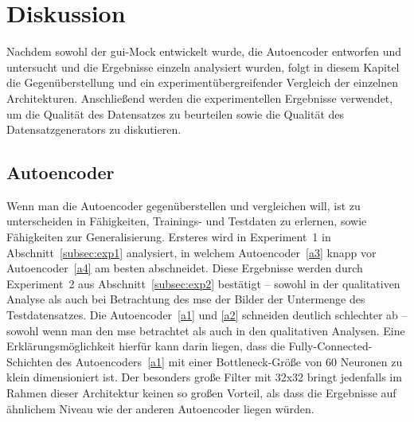 \chapter{Diskussion}
Nachdem sowohl der \gls{gui}-Mock entwickelt wurde, die Autoencoder entworfen und untersucht und die Ergebnisse einzeln analysiert wurden, folgt in diesem Kapitel die Gegenüberstellung und ein experimentübergreifender Vergleich der einzelnen Architekturen. Anschließend werden die experimentellen Ergebnisse verwendet, um die Qualität des Datensatzes zu beurteilen sowie die Qualität des Datensatzgenerators zu diskutieren.

\section{Autoencoder}
Wenn man die Autoencoder gegenüberstellen und vergleichen will, ist zu unterscheiden in Fähigkeiten, Trainings- und Testdaten zu erlernen, sowie Fähigkeiten zur Generalisierung. Ersteres wird in Experiment~1 in Abschnitt~\ref{subsec:exp1} analysiert, in welchem Autoencoder~\ref{a3} knapp vor Autoencoder~\ref{a4} am besten abschneidet. Diese Ergebnisse werden durch Experiment~2 aus Abschnitt~\ref{subsec:exp2} bestätigt -- sowohl in der qualitativen Analyse als auch bei Betrachtung des \gls{mse} der Bilder der Untermenge des Testdatensatzes. Die Autoencoder~\ref{a1} und \ref{a2} schneiden deutlich schlechter ab -- sowohl wenn man den \gls{mse} betrachtet als auch in den qualitativen Analysen. Eine Erklärungsmöglichkeit hierfür kann darin liegen, dass die Fully-Connected-Schichten des Autoencoders~\ref{a1} mit einer Bottleneck-Größe von 60 Neuronen zu klein dimensioniert ist. Der besonders große Filter mit 32x32 bringt jedenfalls im Rahmen dieser Architektur keinen so großen Vorteil, als dass die Ergebnisse auf ähnlichem Niveau wie der anderen Autoencoder liegen würden.


